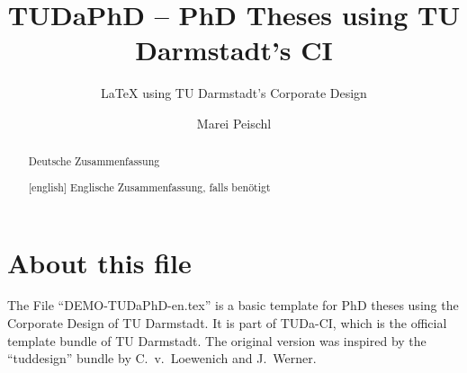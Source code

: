 \documentclass[
	english,%
	ruledheaders=chapter,%
	class=book,%
	thesis={%
			type=dr,
			dr=rernat
	},
	accentcolor=9c,%
	custommargins=true,%
	marginpar=false,%
	parskip=half-,%
	fontsize=11pt,%
]{tudapub}
\begin{document}
\frontmatter

\title{TUDaPhD -- PhD Theses using TU Darmstadt's CI}
\subtitle{\LaTeX{} using TU Darmstadt's Corporate Design}
\author{Marei Peischl}





\submissiondate{\today}
\examdate{\today}


\dedication{To simplify your work with \TeX}
\maketitle
\affidavit%
\begin{abstract}
	Deutsche Zusammenfassung
\end{abstract}

\begin{abstract}[english]
	Englische Zusammenfassung, falls benötigt
\end{abstract}

\tableofcontents

\mainmatter


\chapter{About this file}
The File \enquote{DEMO-TUDaPhD-en.tex} is a basic template for PhD theses using the Corporate Design of TU Darmstadt.
It is part of TUDa-CI, which is the official template bundle of TU Darmstadt.
The original version was inspired by the \enquote{tuddesign} bundle by C.~v.~Loewenich and J.~Werner.


\printbibliography
\end{document}
